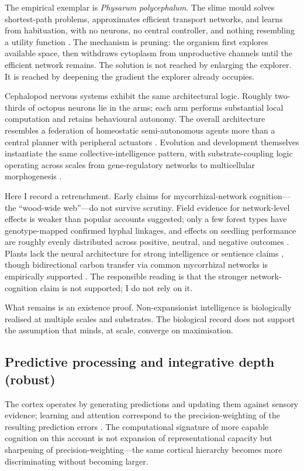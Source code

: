 \documentclass[11pt,twocolumn]{article}
\begin{document}
The empirical exemplar is \emph{Physarum polycephalum}. The slime mould
solves shortest-path problems, approximates efficient transport networks,
and learns from habituation, with no neurons, no central controller, and
nothing resembling a utility function \citep{Tero2010,Reid2023}. The
mechanism is pruning: the organism first explores available space, then
withdraws cytoplasm from unproductive channels until the efficient
network remains. The solution is not reached by enlarging the explorer.
It is reached by deepening the gradient the explorer already occupies.

Cephalopod nervous systems exhibit the same architectural logic. Roughly
two-thirds of octopus neurons lie in the arms; each arm performs
substantial local computation and retains behavioural autonomy. The
overall architecture resembles a federation of homeostatic semi-autonomous
agents more than a central planner with peripheral actuators
\citep{GodfreySmith2016}. Evolution and development themselves instantiate
the same collective-intelligence pattern, with substrate-coupling logic
operating across scales from gene-regulatory networks to multicellular
morphogenesis \citep{WatsonLevin2023}.

Here I record a retrenchment. Early claims for mycorrhizal-network
cognition—the ``wood-wide web''—do not survive scrutiny. Field evidence
for network-level effects is weaker than popular accounts suggested; only
a few forest types have genotype-mapped confirmed hyphal linkages, and
effects on seedling performance are roughly evenly distributed across
positive, neutral, and negative outcomes \citep{Karst2023}. Plants lack
the neural architecture for strong intelligence or sentience claims
\citep{Robinson2024}, though bidirectional carbon transfer via common
mycorrhizal networks is empirically supported \citep{Simard2025}. The
responsible reading is that the stronger network-cognition claim is not
supported; I do not rely on it.

What remains is an existence proof. Non-expansionist intelligence is
biologically realised at multiple scales and substrates. The biological
record does not support the assumption that minds, at scale, converge on
maximisation.

\subsection{Predictive processing and integrative depth (robust)}

The cortex operates by generating predictions and updating them against
sensory evidence; learning and attention correspond to the
precision-weighting of the resulting prediction errors
\citep{Clark2013,Friston2010,Clark2016,Hohwy2013}. The computational
signature of more capable cognition on this account is not expansion of
representational capacity but sharpening of precision-weighting—the same
cortical hierarchy becomes more discriminating without becoming larger.
\end{document}

